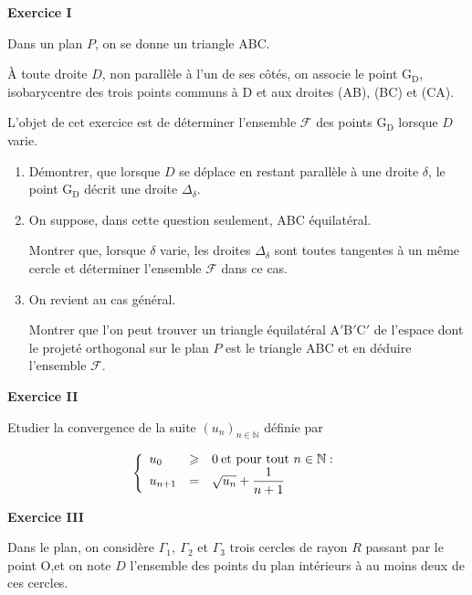 \documentclass[a4paper,11pt]{article}
\newcommand{\N}{\mathbb{N}}
\begin{document}
\begin{center}\textbf{{\color{blue} Exercice I}}
\end{center}

Dans un plan $P$, on se donne un triangle ABC. 

À toute droite $D$, non parallèle à l'un de ses côtés, on associe le point G$_{\text{D}}$, isobarycentre des trois points communs à D et aux droites (AB), (BC) et (CA). 

L'objet de cet exercice est de déterminer l'ensemble $\mathcal{F}$ des points G$_{\text{D}}$ lorsque $D$ varie.

\medskip

\begin{enumerate}
\item Démontrer, que lorsque $D$ se déplace en restant parallèle à une droite $\delta$, le point G$_{\text{D}}$ décrit une droite $\Delta_{\delta}$.
\item On suppose, dans cette question seulement, ABC équilatéral. 

Montrer que, lorsque $\delta$ varie, les droites $\Delta_{\delta}$ sont toutes tangentes à un même cercle et déterminer l'ensemble $\mathcal{F}$ dans ce cas.
\item On revient au cas général. 

Montrer que l'on peut trouver un triangle équilatéral A$'$B$'$C$'$ de l'espace dont le projeté orthogonal sur le plan $P$ est le triangle ABC et en déduire l'ensemble $\mathcal{F}$.
\end{enumerate}

\begin{center}\textbf{{\color{blue} Exercice II}}
\end{center}

\medskip

Etudier la convergence de la suite $\left(u_n\right)_{n\in \N}$ définie par 

\[\left\{\begin{array}{l c l}
u_0		&\geqslant 	&0\: \text{et pour tout } n \in  \N :\\
u_{n+1}	& =			&\sqrt{u_n} + \dfrac{1}{n + 1}\\
\end{array}\right.\]

\begin{center}\textbf{{\color{blue} Exercice III}}
\end{center}

\medskip

Dans le plan, on considère $\Gamma_1, \: \Gamma_2$ et $\Gamma_3$ trois cercles de rayon $R$ passant par le point O,et on note $D$ l'ensemble des points du plan intérieurs à au moins deux de ces cercles.
\end{document}
